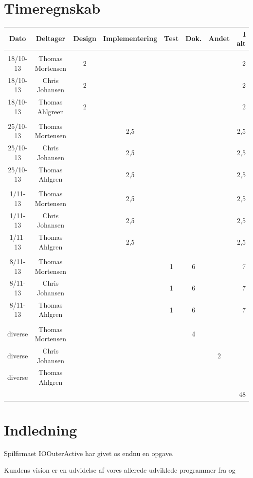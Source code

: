 \documentclass{article}
\begin{document}
\section*{Timeregnskab}
\begin{tabular}{|c|c|c|c|c|c|c|r|} \hline
 Dato & Deltager & Design & Implementering & Test & Dok. & Andet & I alt \\ \hline
&&&&&&& \\ \hline
 18/10-13 & Thomas Mortensen & 2& & & & & 2\\ \hline
 18/10-13 & Chris Johansen & 2& & & & &2 \\ \hline
 18/10-13 & Thomas Ahlgreen & 2& & & & & 2\\ \hline
 &&&&&&& \\ \hline
 25/10-13 & Thomas Mortensen & & 2,5& & & &2,5 \\ \hline
 25/10-13 & Chris Johansen & &2,5 & & & &2,5 \\ \hline
 25/10-13 & Thomas Ahlgren & & 2,5& & & &2,5 \\ \hline
 &&&&&&& \\ \hline
 1/11-13 & Thomas Mortensen & &2,5 & & & &2,5 \\ \hline
 1/11-13 & Chris Johansen & &2,5 & & & & 2,5 \\ \hline
 1/11-13 & Thomas Ahlgren & &2,5 & & & & 2,5 \\ \hline
 &&&&&&& \\ \hline
 8/11-13 & Thomas Mortensen & & &1 &6 & &7 \\ \hline
 8/11-13 & Chris Johansen & & &1 &6 & &7 \\ \hline
 8/11-13 & Thomas Ahlgren & & &1 &6 & &7 \\ \hline
 &&&&&&& \\ \hline
 diverse & Thomas Mortensen & & & &4 & & \\ \hline
 diverse & Chris Johansen & & & & &2 & \\ \hline
 diverse & Thomas Ahlgren & & & & & & \\ \hline
 &&&&&&& 48\\ \hline
\end{tabular}
\newpage
\tableofcontents
\newpage
\section{Indledning}
Spilfirmaet IOOuterActive har givet os endnu en opgave.

Kundens vision er en udvidelse af vores allerede udviklede programmer fra \cite{19del1} og \cite{19del2}
\end{document}

